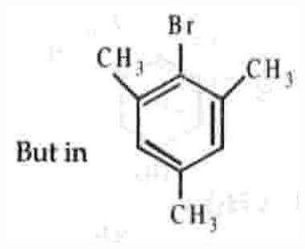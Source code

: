 \documentclass[10pt]{article}
\begin{document}
\includegraphics[max width=\textwidth, center]{2025_01_28_8470952b98110cec3aabg-164(1)}
\end{document}
